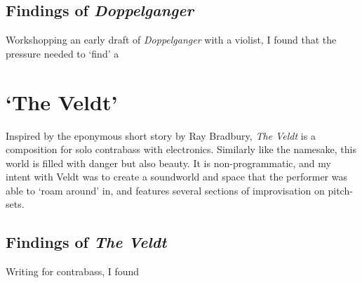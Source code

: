 \subsection{Findings of \emph{Doppelganger}}
Workshopping an early draft of \emph{Doppelganger} with a violist, I found that the pressure needed to `find' a  \lipsum[3]

\section{`The Veldt'}
Inspired by the eponymous short story by Ray Bradbury, \textit{The Veldt} is a composition for solo contrabass with electronics. 
Similarly like the namesake, this world is filled with danger but also beauty. 
It is non-programmatic, and my intent with Veldt was to create a soundworld and space that the performer was able to `roam around' in, and features several sections of improvisation on pitch-sets. \lipsum[1]

\subsection{Findings of \emph{The Veldt}}
Writing for contrabass, I found 
